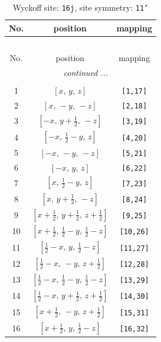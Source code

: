 \documentclass[fleqn,8pt]{jsarticle}
\begin{document}
\begin{longtable}{ccc}
\caption{Wyckoff site: {\tt 16j}, site symmetry: {\tt 11'}}
 \\
 \hline \hline
No. & position & mapping \\ \hline \endfirsthead

\multicolumn{2}{l}{\tablename\ \thetable{}} \\
 \hline \hline
No. & position & mapping \\ \hline \endhead

 \hline \hline
\multicolumn{2}{r}{\footnotesize\it continued ...} \\ \endfoot

 \hline \hline
\multicolumn{2}{r}{} \\ \endlastfoot

1 & $\left[ x,\, y,\, z \right]$ & {\tt [1,17]} \\ \hline
2 & $\left[ x,\, - y,\, - z \right]$ & {\tt [2,18]} \\ \hline
3 & $\left[ - x,\, y + \frac{1}{2},\, - z \right]$ & {\tt [3,19]} \\ \hline
4 & $\left[ - x,\, \frac{1}{2} - y,\, z \right]$ & {\tt [4,20]} \\ \hline
5 & $\left[ - x,\, - y,\, - z \right]$ & {\tt [5,21]} \\ \hline
6 & $\left[ - x,\, y,\, z \right]$ & {\tt [6,22]} \\ \hline
7 & $\left[ x,\, \frac{1}{2} - y,\, z \right]$ & {\tt [7,23]} \\ \hline
8 & $\left[ x,\, y + \frac{1}{2},\, - z \right]$ & {\tt [8,24]} \\ \hline
9 & $\left[ x + \frac{1}{2},\, y + \frac{1}{2},\, z + \frac{1}{2} \right]$ & {\tt [9,25]} \\ \hline
10 & $\left[ x + \frac{1}{2},\, \frac{1}{2} - y,\, \frac{1}{2} - z \right]$ & {\tt [10,26]} \\ \hline
11 & $\left[ \frac{1}{2} - x,\, y,\, \frac{1}{2} - z \right]$ & {\tt [11,27]} \\ \hline
12 & $\left[ \frac{1}{2} - x,\, - y,\, z + \frac{1}{2} \right]$ & {\tt [12,28]} \\ \hline
13 & $\left[ \frac{1}{2} - x,\, \frac{1}{2} - y,\, \frac{1}{2} - z \right]$ & {\tt [13,29]} \\ \hline
14 & $\left[ \frac{1}{2} - x,\, y + \frac{1}{2},\, z + \frac{1}{2} \right]$ & {\tt [14,30]} \\ \hline
15 & $\left[ x + \frac{1}{2},\, - y,\, z + \frac{1}{2} \right]$ & {\tt [15,31]} \\ \hline
16 & $\left[ x + \frac{1}{2},\, y,\, \frac{1}{2} - z \right]$ & {\tt [16,32]} \\
\end{longtable}
\end{document}
